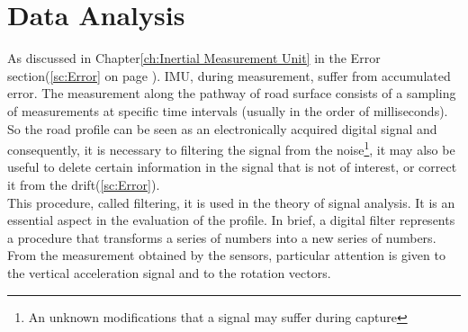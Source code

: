 \documentclass[tesi]{subfiles}
\begin{document}
\chapter{Data Analysis}
\label{ch:Data Analysis}
As discussed in Chapter\ref{ch:Inertial Measurement Unit} in the Error section(\ref{sc:Error} on page \pageref{sc:Error}). IMU, during measurement, suffer from accumulated error. 
The measurement along the pathway of road surface consists of a sampling of measurements at specific time intervals (usually in the order of milliseconds). So the road profile can be seen as an electronically acquired digital signal and consequently, it is necessary to filtering the signal from the noise\footnote{An unknown modifications that a signal may suffer during capture}, it may also be useful to delete certain information in the signal that is not of interest, or correct it from the drift(\ref{sc:Error}).\\

\noindent This procedure, called filtering, it is used in the theory of signal analysis.
It is an essential aspect in the evaluation of the profile\cite{little_book}. In brief, a digital filter represents a procedure that transforms a series of numbers into a new series of numbers\cite{little_book}.
From the measurement obtained by the sensors, particular attention is given to the vertical acceleration signal and to the rotation vectors. \\
\end{document}
